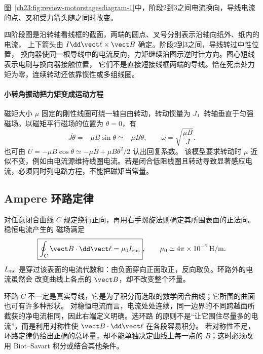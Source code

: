 图~\ref{ch23:fig:review-motorstagesdiagram-1}中，阶段2到3之间电流换向，导线电流的点、叉和受力箭头随之同时改变。
\par\noindent\begin{minipage}{\linewidth}
\motorStagesDiagram
{}\label{ch23:fig:review-motorstagesdiagram-1}
\end{minipage}\par\medskip
四阶段图是沿转轴看线框的截面，两端的圆点、叉号分别表示沿轴向纸外、纸内的电流，
上下箭头由 $I\dd\vect\ell\times\vect B$ 确定。阶段2到3之间，导线转过中性位置，
换向器使同一根导线中的电流反向，力矩继续沿图示逆时针方向。图心短线表示电刷与换向器接触位置，
它们不是直接短接线框两端的导线。恰在死点处力矩为零，连续转动还依靠惯性或多组线圈。


\paragraph{小转角振动把力矩变成运动方程}
磁矩大小 $\mu$ 固定的刚性线圈可绕一轴自由转动，转动惯量为 $J$，转轴垂直于匀强磁场。以磁矩平行磁场的位置为 $\theta=0$，有
\[
 J\ddot\theta=-\mu B\sin\theta\simeq-\mu B\theta,
 \qquad \omega=\sqrt{\frac{\mu B}{J}}.
\]
也可由 $U=-\mu B\cos\theta\simeq-\mu B+\mu B\theta^2/2$ 认出回复系数。
该模型要求转动时 $\mu$ 近似不变，例如由电流源维持线圈电流。若是闭合低阻线圈且转动导致显著感应电流，必须同时列电路方程，不能把磁矩当常量。

\subsection{Ampere 环路定律}

对任意闭合曲线 $C$ 规定绕行正向，再用右手螺旋法则确定其所围表面的正法向。稳恒电流产生的
磁场满足
\begin{equation}
  \boxed{\oint_C\vect B\cdot\dd\vect\ell=\mu_0 I_{\rm enc}},
  \qquad
  \mu_0\simeq4\pi\times10^{-7}\,\mathrm{H/m}.
\end{equation}
$I_{\rm enc}$ 是穿过该表面的电流代数和：由负面穿向正面取正，反向取负。环路外的电流虽然会
改变曲线上各点的 $\vect B$，却不改变整个环量。

环路 $C$ 不一定是真实导线，它是为了积分而选取的数学闭合曲线；它所围的曲面也可有许多种形状。
对稳恒电流而言，电流处处连续，同一边界的不同跨越面所截获的净电流相同，因此右端定义明确。选环路
的原则不是“让它围住尽量多的电流”，而是利用对称性使 $\vect B\cdot\dd\vect\ell$ 在各段容易积分。
若对称性不足，环路定律仍给出正确的总环量，却不能单独决定曲线上每一点的 $B$；这时必须改用
Biot--Savart 积分或结合其他条件。

